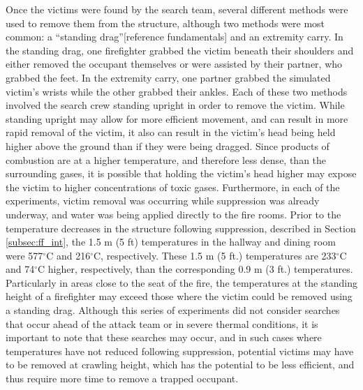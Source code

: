 \documentclass[12pt,oneside]{article}
\begin{document}
Once the victims were found by the search team, several different methods were used to remove them from the structure, although two methods were most common: a ``standing drag''[reference fundamentals] and an extremity carry. In the standing drag, one firefighter grabbed the victim beneath their shoulders and either removed the occupant themselves or were assisted by their partner, who grabbed the feet. In the extremity carry, one partner grabbed the simulated victim's wrists while the other grabbed their ankles. Each of these two methods involved the search crew standing upright in order to remove the victim. While standing upright may allow for more efficient movement, and can result in more rapid removal of the victim, it also can result in the victim's head being held higher above the ground than if they were being dragged. Since products of combustion are at a higher temperature, and therefore less dense, than the surrounding gases, it is possible that holding the victim's head higher may expose the victim to higher concentrations of toxic gases. Furthermore, in each of the experiments, victim removal was occurring while suppression was already underway, and water was being applied directly to the fire rooms. Prior to the temperature decreases in the structure following suppression, described in Section \ref{subsec:ff_int}, the 1.5 m (5 ft) temperatures in the hallway and dining room were 577$^{\circ}$C and 216$^{\circ}$C, respectively. These 1.5 m (5 ft.) temperatures are 233$^{\circ}$C and 74$^{\circ}$C higher, respectively, than the corresponding 0.9 m (3 ft.) temperatures. Particularly in areas close to the seat of the fire, the temperatures at the standing height of a firefighter may exceed those where the victim could be removed using a standing drag. Although this series of experiments did not consider searches that occur ahead of the attack team or in severe thermal conditions, it is important to note that these searches may occur, and in such cases where temperatures have not reduced following suppression, potential victims may have to be removed at crawling height, which has the potential to be less efficient, and thus require more time to remove a trapped occupant.  
\end{document}
